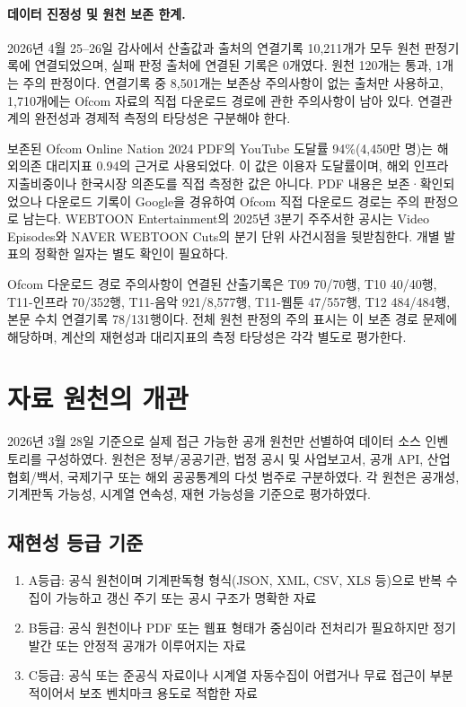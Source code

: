 \documentclass[11pt,a4paper]{report}
\begin{document}
\paragraph{데이터 진정성 및 원천 보존 한계.}
2026년 4월 25--26일 감사에서 산출값과 출처의 연결기록 10,211개가 모두 원천 판정기록에 연결되었으며, 실패 판정 출처에 연결된 기록은 0개였다. 원천 120개는 통과, 1개는 주의 판정이다. 연결기록 중 8,501개는 보존상 주의사항이 없는 출처만 사용하고, 1,710개에는 Ofcom 자료의 직접 다운로드 경로에 관한 주의사항이 남아 있다. 연결관계의 완전성과 경제적 측정의 타당성은 구분해야 한다.

보존된 Ofcom \textsf{Online Nation 2024} PDF의 YouTube 도달률 94\%(4,450만 명)는 해외의존 대리지표 0.94의 근거로 사용되었다. 이 값은 이용자 도달률이며, 해외 인프라 지출비중이나 한국시장 의존도를 직접 측정한 값은 아니다. PDF 내용은 보존·확인되었으나 다운로드 기록이 Google을 경유하여 Ofcom 직접 다운로드 경로는 주의 판정으로 남는다. WEBTOON Entertainment의 2025년 3분기 주주서한 공시는 Video Episodes와 NAVER WEBTOON Cuts의 분기 단위 사건시점을 뒷받침한다. 개별 발표의 정확한 일자는 별도 확인이 필요하다.

Ofcom 다운로드 경로 주의사항이 연결된 산출기록은 T09 70/70행, T10 40/40행, T11-인프라 70/352행, T11-음악 921/8,577행, T11-웹툰 47/557행, T12 484/484행, 본문 수치 연결기록 78/131행이다. 전체 원천 판정의 주의 표시는 이 보존 경로 문제에 해당하며, 계산의 재현성과 대리지표의 측정 타당성은 각각 별도로 평가한다.

\section{자료 원천의 개관}
2026년 3월 28일 기준으로 실제 접근 가능한 공개 원천만 선별하여 데이터 소스 인벤토리를 구성하였다. 원천은 정부/공공기관, 법정 공시 및 사업보고서, 공개 API, 산업협회/백서, 국제기구 또는 해외 공공통계의 다섯 범주로 구분하였다. 각 원천은 공개성, 기계판독 가능성, 시계열 연속성, 재현 가능성을 기준으로 평가하였다.

\subsection{재현성 등급 기준}
\begin{enumerate}[label=\arabic*.]
  \item A등급: 공식 원천이며 기계판독형 형식(JSON, XML, CSV, XLS 등)으로 반복 수집이 가능하고 갱신 주기 또는 공시 구조가 명확한 자료
  \item B등급: 공식 원천이나 PDF 또는 웹표 형태가 중심이라 전처리가 필요하지만 정기 발간 또는 안정적 공개가 이루어지는 자료
  \item C등급: 공식 또는 준공식 자료이나 시계열 자동수집이 어렵거나 무료 접근이 부분적이어서 보조 벤치마크 용도로 적합한 자료
\end{enumerate}
\end{document}
